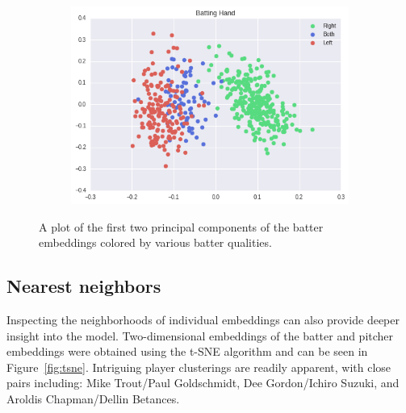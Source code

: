 \documentclass{article}
\begin{document}
\begin{figure}[h]
    \begin{subfigure}{0.5\linewidth}
    \centering
    \includegraphics[width=1\linewidth]{batter_hand.png}
    \caption{}
    \end{subfigure}
\caption{A plot of the first two principal components of the batter embeddings colored by various batter qualities.}
\label{fig:batter_traits}
\end{figure}

\subsection{Nearest neighbors}

Inspecting the neighborhoods of individual embeddings can also provide deeper insight into the model. Two-dimensional embeddings of the batter and pitcher embeddings were obtained using the t-SNE algorithm \parencite{VanderMaaten2008} and can be seen in Figure~\ref{fig:tsne}. Intriguing player clusterings are readily apparent, with close pairs including: Mike Trout/Paul Goldschmidt, Dee Gordon/Ichiro Suzuki, and Aroldis Chapman/Dellin Betances.
\end{document}
